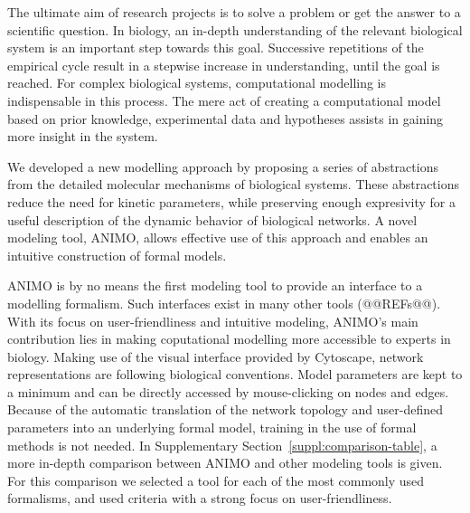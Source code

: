 The ultimate aim of research projects is to solve a problem or get
the answer to a scientific question. In biology, an in-depth understanding of
the relevant biological system is an important step towards this goal. Successive 
repetitions of the empirical cycle result in a stepwise increase in understanding,
until the goal is reached. For complex biological systems, computational modelling is 
indispensable in this process. The mere act of creating 
a computational model based on prior knowledge, experimental data and hypotheses 
assists in gaining more insight in the system. 


We developed a new modelling approach by proposing a series of abstractions from the detailed 
molecular mechanisms of biological systems. These abstractions reduce the need for kinetic 
parameters, while preserving enough expresivity for a useful description of the dynamic 
behavior of biological networks. A novel modeling tool, ANIMO, allows 
effective use of this approach and enables an intuitive construction of formal models.

ANIMO is by no means the first modeling tool to provide an interface to a
modelling formalism. Such interfaces exist in many other tools (@@REFs@@). With its
focus on user-friendliness and intuitive modeling, ANIMO's main contribution lies 
in making coputational modelling more accessible to experts in biology.
Making use of the visual
interface provided by Cytoscape, network representations are following biological conventions. 
Model parameters are kept to a minimum and can be directly accessed by mouse-clicking on 
nodes and edges. Because of the automatic translation of the network topology and 
user-defined parameters into an underlying formal model, training in the use of formal methods 
is not needed. In Supplementary Section~\ref{suppl:comparison-table}, a more in-depth
comparison between ANIMO and other modeling tools is given. For this comparison we selected a tool
for each of the most commonly used formalisms, and used criteria with a strong focus on 
user-friendliness.

